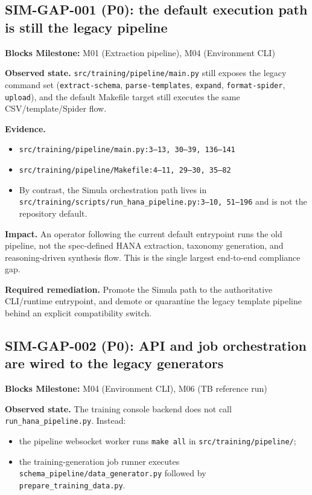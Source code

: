 \documentclass[12pt,a4paper,twoside]{report}
\begin{document}
\subsection*{SIM-GAP-001 (P0): the default execution path is still the legacy pipeline}
\label{gap:sim-001}
\textbf{Blocks Milestone:} M01 (Extraction pipeline), M04 (Environment CLI)

\textbf{Observed state.}
\texttt{src/training/pipeline/main.py} still exposes the
legacy command set
(\texttt{extract-schema}, \texttt{parse-templates},
\texttt{expand}, \texttt{format-spider}, \texttt{upload}),
and the default Makefile target still executes the same
CSV/template/Spider flow.

\textbf{Evidence.}
\begin{itemize}
\item \texttt{src/training/pipeline/main.py:3--13, 30--39,
136--141}
\item \texttt{src/training/pipeline/Makefile:4--11, 29--30,
35--82}
\item By contrast, the Simula orchestration path lives in
\texttt{src/training/scripts/run\_hana\_pipeline.py:3--10,
51--196} and is not the repository default.
\end{itemize}

\textbf{Impact.}
An operator following the current default entrypoint runs the old
pipeline, not the spec-defined HANA extraction, taxonomy generation,
and reasoning-driven synthesis flow. This is the single largest
end-to-end compliance gap.

\textbf{Required remediation.}
Promote the Simula path to the authoritative CLI/runtime entrypoint,
and demote or quarantine the legacy template pipeline behind an
explicit compatibility switch.

\subsection*{SIM-GAP-002 (P0): API and job orchestration are wired to the legacy generators}
\label{gap:sim-002}
\textbf{Blocks Milestone:} M04 (Environment CLI), M06 (TB reference run)

\textbf{Observed state.}
The training console backend does not call
\texttt{run\_hana\_pipeline.py}. Instead:
\begin{itemize}
\item the pipeline websocket worker runs \texttt{make all} in
\texttt{src/training/pipeline/};
\item the training-generation job runner executes
\texttt{schema\_pipeline/data\_generator.py} followed by
\texttt{prepare\_training\_data.py}.
\end{itemize}
\end{document}
